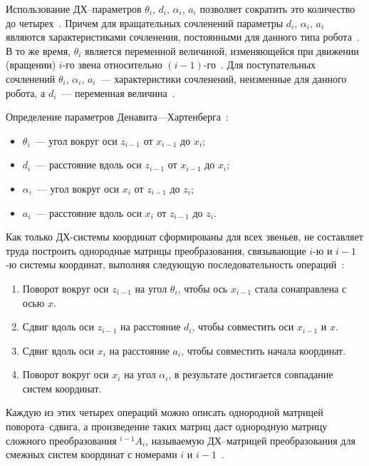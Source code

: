 \documentclass[oneside, final, 14pt]{extarticle}
\begin{document}
Использование ДХ--параметров \(\theta_i\), \(d_i\), \(\alpha_i\), \(a_i\) позволяет сократить это количество до четырех~\cite{borisov:mod_rob}.
Причем для вращательных сочленений параметры \(d_i\), \(\alpha_i\), \(a_i\) являются характеристиками сочленения, постоянными для данного типа робота~\cite{fu:rob_tech}.
В то же время, \(\theta_i\) является переменной величиной, изменяющейся при движении (вращении) \(i\)-го звена относительно \((i - 1)\)-го~\cite{fu:rob_tech}.
Для поступательных сочленений  \(\theta_i\), \(\alpha_i\), \(a_i\)~--- характеристики сочленений, неизменные для данного робота, а \(d_i\)~--- переменная величина~\cite{fu:rob_tech}.
\par
Определение параметров Денавита---Хартенберга~\cite{borisov:mod_rob}:
\begin{itemize}
  \item \(\theta_i\)~--- угол вокруг оси \(z_{i - 1}\) от \(x_{i - 1}\) до \(x_i\);
  \item \(d_i\)~--- расстояние вдоль оси \(z_{i - 1}\) от \(x_{i - 1}\) до \(x_i\);
  \item \(\alpha_i\)~--- угол вокруг оси \(x_i\) от \(z_{i - 1}\) до \(z_i\);
  \item \(a_i\)~--- расстояние вдоль оси \(x_i\) от \(z_{i - 1}\) до \(z_i\).
\end{itemize}
\par
Как только ДХ-системы координат сформированы для всех звеньев, не составляет труда построить однородные матрицы преобразования, связывающие \(i\)-ю и \(i-1\)-ю системы координат, выполняя следующую последовательность операций~\cite{fu:rob_tech}:
\begin{enumerate}
  \item Поворот вокруг оси \(z_{i-1}\) на угол \(\theta_i\), чтобы ось \(x_{i-1}\) стала сонаправлена с осью \(x\).
  \item Сдвиг вдоль оси \(z_{i-1}\) на расстояние \(d_i\), чтобы совместить оси \(x_{i-1}\) и \(x\).
  \item Сдвиг вдоль оси \(x_i\) на расстояние \(a_i\), чтобы совместить начала координат.
  \item Поворот вокруг оси \(x_i\) на угол \(\alpha_i\), в результате достигается совпадание систем координат.
\end{enumerate}
\par
Каждую из этих четырех операций можно описать однородной матрицей поворота--сдвига, а произведение таких матриц даст однородную матрицу сложного преобразования \({}^{i-1}A_i\), называемую ДХ--матрицей преобразования для смежных систем координат с номерами \(i\) и \(i-1\)~\cite{fu:rob_tech}.
\end{document}

